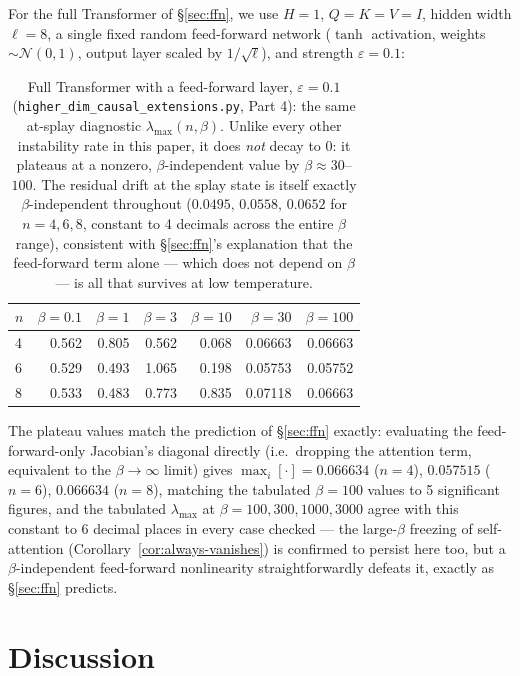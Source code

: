 \documentclass[11pt]{article}
\begin{document}
For the full Transformer of \S\ref{sec:ffn}, we use $H=1$, $Q=K=V=I$, hidden width $\ell=8$, a single fixed random feed-forward network ($\tanh$ activation, weights $\sim\mathcal N(0,1)$, output layer scaled by $1/\sqrt\ell$), and strength $\varepsilon=0.1$:

\begin{table}[h]
\centering
\begin{tabular}{@{}l r r r r r r@{}}
\toprule
$n$ & $\beta=0.1$ & $\beta=1$ & $\beta=3$ & $\beta=10$ & $\beta=30$ & $\beta=100$ \\
\midrule
4 & 0.562 & 0.805 & 0.562 & 0.068 & 0.06663 & 0.06663 \\
6 & 0.529 & 0.493 & 1.065 & 0.198 & 0.05753 & 0.05752 \\
8 & 0.533 & 0.483 & 0.773 & 0.835 & 0.07118 & 0.06663 \\
\bottomrule
\end{tabular}
\caption{Full Transformer with a feed-forward layer, $\varepsilon=0.1$ (\texttt{higher\_dim\_causal\_extensions.py}, Part 4): the same at-splay diagnostic $\lambda_{\max}(n,\beta)$. Unlike every other instability rate in this paper, it does \emph{not} decay to $0$: it plateaus at a nonzero, $\beta$-independent value by $\beta\approx30$--$100$. The residual drift at the splay state is itself exactly $\beta$-independent throughout ($0.0495,\,0.0558,\,0.0652$ for $n=4,6,8$, constant to 4 decimals across the entire $\beta$ range), consistent with \S\ref{sec:ffn}'s explanation that the feed-forward term alone --- which does not depend on $\beta$ --- is all that survives at low temperature.}
\label{tab:ffn-numerics}
\end{table}

The plateau values match the prediction of \S\ref{sec:ffn} exactly: evaluating the feed-forward-only Jacobian's diagonal directly (i.e.\ dropping the attention term, equivalent to the $\beta\to\infty$ limit) gives $\max_i[\cdot]=0.066634$ ($n=4$), $0.057515$ ($n=6$), $0.066634$ ($n=8$), matching the tabulated $\beta=100$ values to 5 significant figures, and the tabulated $\lambda_{\max}$ at $\beta=100,300,1000,3000$ agree with this constant to 6 decimal places in every case checked --- the large-$\beta$ freezing of self-attention (Corollary~\ref{cor:always-vanishes}) is confirmed to persist here too, but a $\beta$-independent feed-forward nonlinearity straightforwardly defeats it, exactly as \S\ref{sec:ffn} predicts.

\section{Discussion}
\label{sec:discussion}
\end{document}
